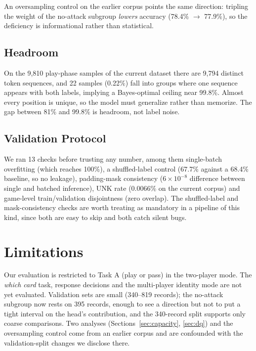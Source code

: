\documentclass[11pt]{article}
\begin{document}
An oversampling control on the earlier corpus points the same direction: tripling the weight
of the no-attack subgroup \emph{lowers} accuracy (78.4\% $\to$ 77.9\%), so the deficiency is
informational rather than statistical.

\subsection{Headroom}
\label{sec:headroom}

On the 9,810 play-phase samples of the current dataset there are 9,794 distinct token
sequences, and 22 samples (0.22\%) fall into groups where one sequence appears with both
labels, implying a Bayes-optimal ceiling near 99.8\%. Almost every position is unique, so
the model must generalize rather than memorize. The gap between 81\% and 99.8\% is headroom,
not label noise.

\subsection{Validation Protocol}

We ran 13 checks before trusting any number, among them single-batch overfitting (which
reaches 100\%), a shuffled-label control (67.7\% against a 68.4\% baseline, so no leakage),
padding-mask consistency ($6\times10^{-8}$ difference between single and batched inference),
UNK rate (0.0066\% on the current corpus) and game-level train/validation disjointness (zero
overlap). The shuffled-label and mask-consistency checks are worth treating as mandatory in
a pipeline of this kind, since both are easy to skip and both catch silent bugs.

\section{Limitations}

Our evaluation is restricted to Task A (play or pass) in the two-player mode. The
\emph{which card} task, response decisions and the multi-player identity mode are not yet
evaluated. Validation sets are small (340--819 records); the no-attack subgroup now rests on
395 records, enough to see a direction but not to put a tight interval on the head's
contribution, and the 340-record split supports only coarse comparisons. Two analyses
(Sections~\ref{sec:capacity}, \ref{sec:dq}) and the oversampling control come from an
earlier corpus and are confounded with the validation-split changes we disclose there.
\end{document}
